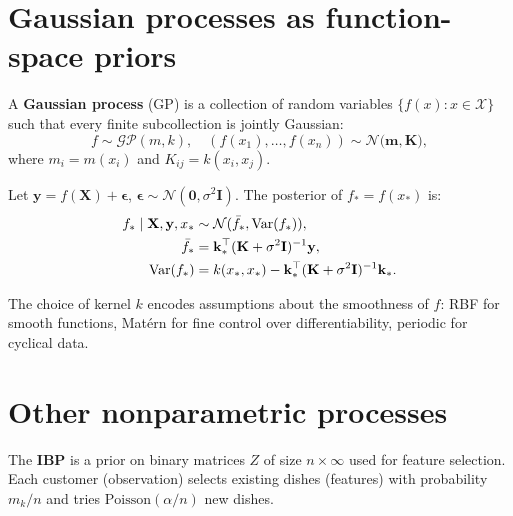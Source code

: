 \section{Gaussian processes as function-space priors}

\begin{definition}
A \textbf{Gaussian process} (GP) is a collection of random variables
$\{f(x) : x \in \mathcal{X}\}$ such that every finite subcollection is
jointly Gaussian:
\[
  f \sim \mathcal{GP}(m, k), \quad
  (f(x_1), \ldots, f(x_n)) \sim \mathcal{N}\!\bigl(\mathbf{m}, \mathbf{K}\bigr),
\]
where $m_i = m(x_i)$ and $K_{ij} = k(x_i, x_j)$.
\end{definition}

\begin{theorem}
Let $\mathbf{y} = f(\mathbf{X}) + \boldsymbol{\epsilon}$,
$\boldsymbol{\epsilon} \sim \mathcal{N}(\mathbf{0}, \sigma^2 \mathbf{I})$.
The posterior of $f_* = f(x_*)$ is:
\begin{align}
  f_* \mid \mathbf{X}, \mathbf{y}, x_* &\sim \mathcal{N}(\bar{f}_*, \mathrm{Var}(f_*)), \\
  \bar{f}_* &= \mathbf{k}_*^\top (\mathbf{K} + \sigma^2 \mathbf{I})^{-1}\mathbf{y}, \\
  \mathrm{Var}(f_*) &= k(x_*, x_*) - \mathbf{k}_*^\top(\mathbf{K} + \sigma^2 \mathbf{I})^{-1}\mathbf{k}_*.
\end{align}
\end{theorem}

\begin{remark}
The choice of kernel $k$ encodes assumptions about the smoothness of $f$:
RBF for smooth functions, Mat\'ern for fine control over differentiability,
periodic for cyclical data.
\end{remark}

\section{Other nonparametric processes}

\begin{definition}
The \textbf{IBP} is a prior on binary matrices $Z$ of size $n \times \infty$
used for feature selection. Each customer (observation) selects existing
dishes (features) with probability $m_k / n$ and tries
$\mathrm{Poisson}(\alpha / n)$ new dishes.
\end{definition}

